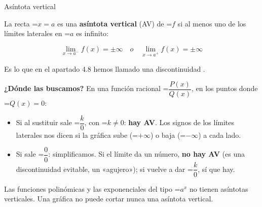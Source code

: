 \documentclass[11pt,a4paper]{article}
\newcommand{\fmm}[1]{\setbox0=\hbox{$#1$}\ifdim\wd0>\linewidth\[#1\]\else\mbox{\box0}\fi}
\newcommand{\fmuline}[1]{\textbf{\color{fmaccent}#1}}
\newcommand{\fmbadge}[2]{\tcbox[on line,colback=#1,colframe=#1,arc=2mm,boxsep=0pt,left=4pt,right=4pt,top=1.5pt,bottom=1.5pt]{\color{white}\footnotesize\bfseries #2}}
\begin{document}
  
\begin{fmdef}{Asíntota vertical}
\par\noindent \begin{minipage}[t]{0.48\linewidth}\vspace{0pt}\raggedright La recta \fmm{x=a} es una \textbf{asíntota vertical} (AV) de \fmm{f} si al menos uno de los límites laterales en \fmm{a} es infinito:

          
\[\lim_{x\to a^-}f(x)=\pm\infty\quad o\quad\lim_{x\to a^+}f(x)=\pm\infty\]

          

Es lo que en el apartado 4.8 hemos llamado una discontinuidad \fmbadge{fmas}{asintótica}.\end{minipage}\hfill\begin{minipage}[t]{0.48\linewidth}\vspace{0pt}\raggedright \begin{center}\end{center}\end{minipage}\par\medskip

      

\fmuline{¿Dónde las buscamos?} En una función racional \fmm{\dfrac{P(x)}{Q(x)}}, en los puntos donde \fmm{Q(x)=0}:

      
\begin{itemize}
\item Si al sustituir sale \fmm{\dfrac{k}{0}}, con \fmm{k\neq0}: \textbf{hay AV}. Los signos de los límites laterales nos dicen si la gráfica sube (\fmm{+\infty}) o baja (\fmm{-\infty}) a cada lado.
\item Si sale \fmm{\dfrac00}: simplificamos. Si el límite da un número, \textbf{no hay AV} (es una discontinuidad evitable, un «agujero»); si vuelve a dar \fmm{\dfrac k0}, sí que hay.
\end{itemize}

      
\begin{fmnote}Las funciones polinómicas y las exponenciales del tipo \fmm{a^x} no tienen asíntotas verticales. Una gráfica no puede cortar nunca una asíntota vertical.\end{fmnote}
\end{fmdef}
\end{document}
